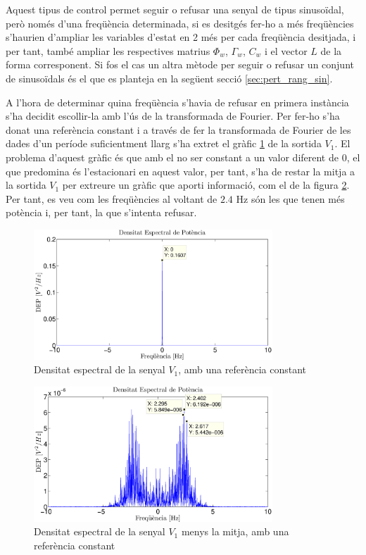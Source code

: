 \documentclass[12pt,a4paper,final,twoside,openright]{report}
\begin{document}
Aquest tipus de control permet seguir o refusar una senyal de tipus sinusoïdal, però només d'una freqüència determinada, si es desitgés fer-ho a més freqüències s'haurien d'ampliar les variables d'estat en 2 més per cada freqüència desitjada, i per tant, també ampliar les respectives matrius $\Phi_w$, $\Gamma_w$, $C_w$ i el vector $L$ de la forma corresponent. Si fos el cas un altra mètode per seguir o refusar un conjunt de sinusoïdals és el que es planteja en la següent secció \ref{sec:pert_rang_sin}.

A l'hora de determinar quina freqüència s'havia de refusar en primera instància s'ha decidit escollir-la amb l'ús de la transformada de Fourier. Per fer-ho s'ha donat una referència constant i a través de fer la transformada de Fourier de les dades d'un període suficientment llarg s'ha extret el gràfic \ref{fig:power_spectral_mean} de la sortida $V_1$. El problema d'aquest gràfic és que amb el no ser constant a un valor diferent de 0, el que predomina és l'estacionari en aquest valor, per tant, s'ha de restar la mitja a la sortida $V_1$ per extreure un gràfic que aporti informació, com el de la figura \ref{fig:power_spectral_nomean_bef_sin_pols_imag}. Per tant, es veu com les freqüències al voltant de $2.4$ Hz són les que tenen més potència i, per tant, la que s'intenta refusar.

\begin{figure}[h]
\centering
\includegraphics[width=0.8\textwidth]{Imatges/power_spectral_mean.eps}
\caption{Densitat espectral de la senyal $V_1$, amb una referència constant\label{fig:power_spectral_mean}}
\end{figure}

\begin{figure}[h]
\centering
\includegraphics[width=0.8\textwidth]{Imatges/power_spectral_nomean_bef_sin_pols_imag.eps}
\caption{Densitat espectral de la senyal $V_1$ menys la mitja, amb una referència constant\label{fig:power_spectral_nomean_bef_sin_pols_imag}}
\end{figure}
\end{document}
